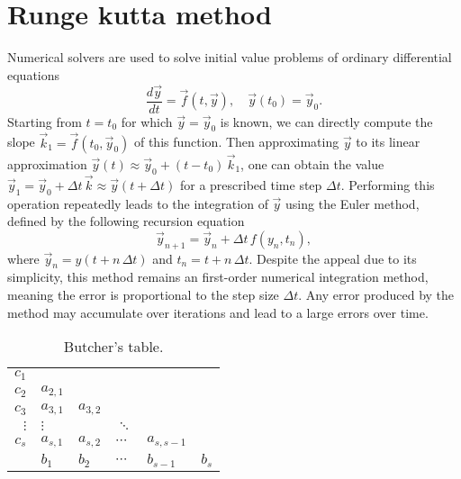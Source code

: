 \chapter{Runge kutta method}\label{app:runge_kutta_method}

Numerical solvers are used to solve initial value problems of ordinary differential equations
\begin{equation}
	\frac{d \vec{y}}{dt} = \vec{f}(t, \vec{y}), \quad \vec{y}(t_0) = \vec{y}_0.
\end{equation}
Starting from $t = t_0$ for which $\vec{y} = \vec{y}_0$ is known, we can directly compute the slope $\vec{k}_1 = \vec{f}(t_0, \vec{y}_0)$ of this function.
Then approximating $\vec{y}$ to its linear approximation $\vec{y}(t) \approx \vec{y}_0 + (t - t_0) \, \vec{k}_1$, one can obtain the value $\vec{y}_1 = \vec{y}_0 + \varDelta t \, \vec{k} \approx \vec{y}(t + \varDelta t)$ for a prescribed time step $\varDelta t$.
Performing this operation repeatedly leads to the integration of $\vec{y}$ using the Euler method, defined by the following recursion equation
\begin{equation}
	\vec{y}_{n+1} = \vec{y}_n + \varDelta t \, f(y_n, t_n),
\end{equation}
where $\vec{y}_n = y(t + n \, \varDelta t)$ and $t_n = t + n \, \varDelta t$.
Despite the appeal due to its simplicity, this method remains an first-order numerical integration method, meaning the error is proportional to the step size $\varDelta t$.
Any error produced by the method may accumulate over iterations and lead to a large errors over time.
\begin{wraptable}[9]{R}[0.5\width]{0.45\textwidth}
	\vspace{-10pt}
	\center
	\begin{tabular}{ r | l l l l l }
		$c_1$ & & & & & \\
		$c_2$ & $a_{2,1}$ & & & & \\
		$c_3$ & $a_{3,1}$ & $a_{3,2}$ & & & \\
		$\vdots$ & $\vdots$ & & $\ddots$ & & \\
		$c_s$ & $a_{s,1}$ & $a_{s,2}$ & $\cdots$ & $a_{s,s-1}$ & \\
		\midrule
		 & $b_1$ & $b_2$ & $\cdots$ & $b_{s-1}$ & $b_s$
	\end{tabular}
	\captionsetup{width=0.4\textwidth}

	\caption{
		Butcher's table.
	}
	\label{tab:butcher_table}
\end{wraptable}

